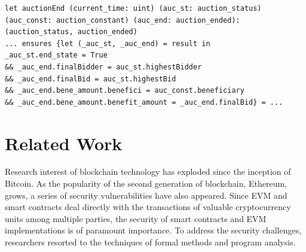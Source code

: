 \documentclass[runningheads]{llncs}
\begin{document}
\begin{verbatim}
let auctionEnd (current_time: uint) (auc_st: auction_status) 
(auc_const: auction_constant) (auc_end: auction_ended): 
(auction_status, auction_ended) 
... ensures {let (_auc_st, _auc_end) = result in 
_auc_st.end_state = True 
&& _auc_end.finalBidder = auc_st.highestBidder 
&& _auc_end.finalBid = auc_st.highestBid
&& _auc_end.bene_amount.benefici = auc_const.beneficiary 
&& _auc_end.bene_amount.benefit_amount = _auc_end.finalBid} = ...
\end{verbatim}

\section{Related Work}\label{Sec: Related}

Research interest of blockchain technology has exploded since the inception of Bitcoin. As the popularity of the second generation of blockchain, 
Ethereum, grows, a series of security vulnerabilities have also appeared. 
Since EVM and smart contracts deal directly with the transactions of valuable cryptocurrency units among multiple parties, 
the security of smart contracts and EVM implementations is of paramount importance. To address the security challenges, 
researchers resorted to the techniques of formal methods and program analysis. 
\end{document}
